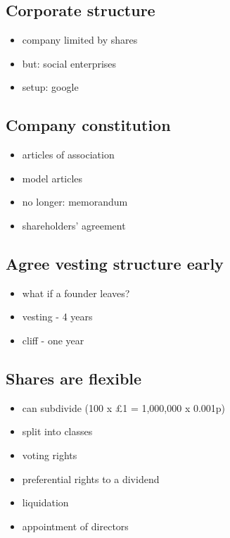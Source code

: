 \subsection{Corporate structure}\label{corporate-structure}

\begin{itemize}
\itemsep1pt\parskip0pt
\item
  company limited by shares
\item
  but: social enterprises
\item
  setup: google
\end{itemize}

\subsection{Company constitution}\label{company-constitution}

\begin{itemize}
\itemsep1pt\parskip0pt
\item
  articles of association
\item
  model articles
\item
  no longer: memorandum
\item
  shareholders' agreement
\end{itemize}

\subsection{Agree vesting structure
early}\label{agree-vesting-structure-early}

\begin{itemize}
\itemsep1pt\parskip0pt
\item
  what if a founder leaves?
\item
  vesting - 4 years
\item
  cliff - one year
\end{itemize}

\subsection{Shares are flexible}\label{shares-are-flexible}

\begin{itemize}
\itemsep1pt\parskip0pt
\item
  can subdivide (100 x £1 = 1,000,000 x 0.001p)
\item
  split into classes
\item
  voting rights
\item
  preferential rights to a dividend
\item
  liquidation
\item
  appointment of directors
\end{itemize}

